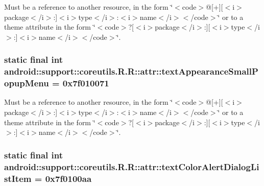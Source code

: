 Must be a reference to another resource, in the form \char`\"{}$<$code$>$@\mbox{[}+\mbox{]}\mbox{[}$<$i$>$package$<$/i$>$:\mbox{]}$<$i$>$type$<$/i$>$:$<$i$>$name$<$/i$>$$<$/code$>$\char`\"{} or to a theme attribute in the form \char`\"{}$<$code$>$?\mbox{[}$<$i$>$package$<$/i$>$:\mbox{]}\mbox{[}$<$i$>$type$<$/i$>$:\mbox{]}$<$i$>$name$<$/i$>$$<$/code$>$\char`\"{}. \hypertarget{classandroid_1_1support_1_1coreutils_1_1_r_1_1attr_b4a699bec30848bfb8ea27008e4ac839}{
\subsubsection[{textAppearanceSmallPopupMenu}]{\setlength{\rightskip}{0pt plus 5cm}static final int android::support::coreutils.R.R::attr::textAppearanceSmallPopupMenu = 0x7f010071}}
\label{classandroid_1_1support_1_1coreutils_1_1_r_1_1attr_b4a699bec30848bfb8ea27008e4ac839}


Must be a reference to another resource, in the form \char`\"{}$<$code$>$@\mbox{[}+\mbox{]}\mbox{[}$<$i$>$package$<$/i$>$:\mbox{]}$<$i$>$type$<$/i$>$:$<$i$>$name$<$/i$>$$<$/code$>$\char`\"{} or to a theme attribute in the form \char`\"{}$<$code$>$?\mbox{[}$<$i$>$package$<$/i$>$:\mbox{]}\mbox{[}$<$i$>$type$<$/i$>$:\mbox{]}$<$i$>$name$<$/i$>$$<$/code$>$\char`\"{}. \hypertarget{classandroid_1_1support_1_1coreutils_1_1_r_1_1attr_7240028895c63d9e1342770f7647ec4f}{
\subsubsection[{textColorAlertDialogListItem}]{\setlength{\rightskip}{0pt plus 5cm}static final int android::support::coreutils.R.R::attr::textColorAlertDialogListItem = 0x7f0100aa}}
\label{classandroid_1_1support_1_1coreutils_1_1_r_1_1attr_7240028895c63d9e1342770f7647ec4f}


